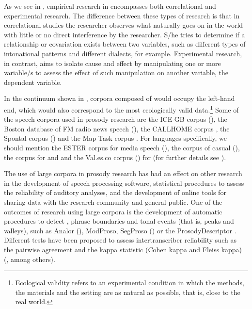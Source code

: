 \documentclass[output=paper]{LSP/langsci}
\begin{document}
As we see in , empirical research in  encompasses both correlational and experimental research. The difference between these types of research is that in correlational studies the researcher observes what naturally goes on in the world with little or no direct interference by the researcher. S/he tries to determine if a relationship or covariation exists between two variables, such as different types of intonational patterns and different dialects, for example. Experimental research, in contrast, aims to isolate cause and effect by manipulating one or more variable/s to assess the effect of such manipulation on another variable, the dependent variable.\largerpage[.75]

In the continuum shown in , corpora composed of  would occupy the left-hand end, which would also correspond to the most ecologically valid data.{\footnote{Ecological validity refers to an experimental condition in which the methods, the materials and the setting are as natural as possible, that is, close to the real world.}} Some of the speech corpora used in prosody research are the ICE-GB corpus (\citealt{Wichmann2003}), the Boston database of FM radio news speech (\citealt{Ostendorf1995}), the CALLHOME corpus \citep{Ogden2006}, the Spontal corpus (\citealt{Edlund2010}) and the Map Task corpus \citep{Anderson1991}. For  languages specifically, we should mention the ESTER corpus for  media speech (\citealt{Gravier2004}), the corpus of casual  (\citealt{Torreira2010}), the  corpus \citep{Garrido2013Glissando} for  and  and the Val.es.co corpus (\citealt{CabedoNebot2013ValEsCo}) for  (for further details see \citealt{Delais-Roussarie2008,Post2012,Delais-Roussarie2014}).\largerpage

The use of large corpora in prosody research has had an effect on other research in the development of speech processing software, statistical procedures to assess the reliability of auditory analyses, and the development of online tools for sharing data with the research community and general public. One of the outcomes of research using large corpora is the development of automatic procedures to detect , phrase boundaries and tonal events (that is, peaks and valleys), such as Analor (\citealt{Avanzi2010}), ModProso, SegProso (\citealt{Garrido2013ModProso,Garrido2013SegProso}) or the ProsodyDescriptor \citep{Barbosa2013}. Different tests have been proposed to assess intertranscriber reliability such as the pairwise  agreement and the kappa statistic (Cohen kappa and Fleiss kappa)  (\citealt{Brennan1981,Yoon2004,Randolph2008,Mo2008,Escudero2012}, among others). 
\end{document}
